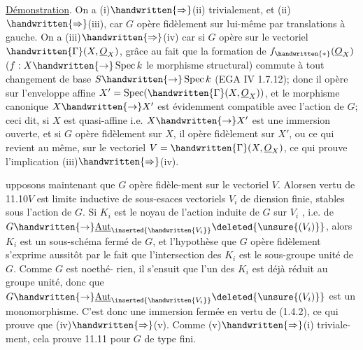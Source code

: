 \uline{Démonstration}. On a (i)$\handwritten{\Rightarrow}$(ii) trivialement, et (ii)$\handwritten{\Rightarrow}$(iii), car $G$ opère fidèlement sur lui-même par translations à gauche. On a (iii)$\handwritten{\Rightarrow}$(iv) car si $G$ opère  sur le vectoriel $\handwritten{\Gamma}(X,\underline{O}_X)$, grâce au fait que la formation de $f_{\handwritten{*}}(\underline{O}_X)$ ($f:X\handwritten{\to}\operatorname{Spec}k$ le morphisme structural) commute à tout changement de base $S\handwritten{\to}\operatorname{Spec}k$ (EGA IV 1.7.12); donc il opère sur l'enveloppe affine $X'=\operatorname{Spec}(\handwritten{\Gamma}(X,\underline{O}_X))$, et le morphisme canonique $X\handwritten{\to}X'$ est évidemment compatible avec l'action de $G$; ceci dit, si $X$ est quasi-affine i.e. $X\handwritten{\to}X'$ est une immersion ouverte, et si $G$ opère fidèlement sur $X$, il opère fidèlement sur $X'$, ou ce qui revient au même, sur le vectoriel $V=\handwritten{\Gamma}(X,\underline{O}_X)$, ce qui prouve l'implication (iii)$\handwritten{\Rightarrow}$(iv).

upposons maintenant  que $G$ opère fidèle-\linebreak ment sur le vectoriel $V$. Alors\handwritten{,}en vertu de 11.10\handwritten{,}$V$ est limite inductive de sous-esaces vectoriels $V_i$ de diension finie, stables sous l'action de $G$. Si $K_i$ est le noyau de l'action induite de $G$ sur $V_i$ , i.e. de $G\handwritten{\to}\underline{\operatorname{Aut}}_{\inserted{\handwritten{V_i}}}\deleted{\unsure{(V_i)}}$, alors $K_i$ est un sous-schéma fermé de $G$, et l'hypothèse que $G$ opère fidèlement s'exprime aussitôt par le fait que  l'intersection des $K_i$ est le sous-groupe unité de $G$. Comme $G$ est noethé-%
%
%
rien, il s'ensuit que l'un des $K_i$ est déjà réduit au groupe unité, donc que $G\handwritten{\to}\underline{\operatorname{Aut}}_{\inserted{\handwritten{V_i}}}\deleted{\unsure{(V_i)}}$ est un monomorphisme. C'est donc une immersion fermée en vertu de (1.4.2), ce qui prouve que (iv)$\handwritten{\Rightarrow}$(v). Comme (v)$\handwritten{\Rightarrow}$(i) triviale-\linebreak ment, cela prouve 11.11 pour $G$ de type fini.

